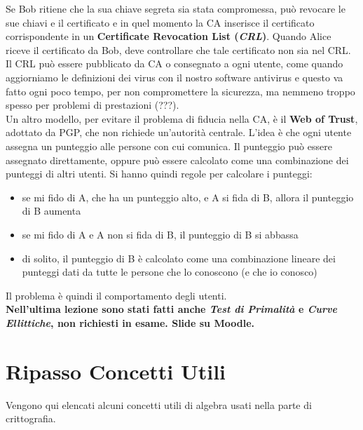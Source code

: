 \documentclass[a4paper,12pt, oneside]{book}
\begin{document}
Se Bob ritiene che la sua chiave segreta sia stata compromessa, può revocare le
sue chiavi e il certificato e in quel momento la CA inserisce il certificato
corrispondente in un \textbf{Certificate Revocation List (\textit{CRL})}. Quando
Alice riceve il certificato da Bob, deve controllare che tale certificato non
sia nel CRL. Il CRL può essere pubblicato da CA o consegnato a ogni utente, come
quando aggiorniamo le definizioni dei virus con il nostro software antivirus e
questo va fatto ogni poco tempo, per non compromettere la sicurezza, ma nemmeno
troppo spesso per problemi di prestazioni (???).\\
Un altro modello, per evitare il problema di fiducia nella CA, è il \textbf{Web
  of Trust}, adottato da PGP, che non richiede un'autorità centrale. L'idea è
che ogni utente assegna un punteggio alle persone con cui comunica. Il punteggio
può essere assegnato direttamente, oppure può essere calcolato come una
combinazione dei punteggi di altri utenti. Si hanno quindi regole per calcolare
i punteggi:
\begin{itemize}
  \item se mi fido di A, che ha un punteggio alto, e A si fida di B, allora il
  punteggio di B aumenta  
  \item se mi fido di A e A non si fida di B, il punteggio di B si abbassa 
  \item di solito, il punteggio di B è calcolato come una combinazione lineare
  dei punteggi dati da tutte le persone che lo conoscono (e che io conosco)  
\end{itemize}
Il problema è quindi il comportamento degli utenti.\\
\textbf{Nell'ultima lezione sono stati fatti anche \textit{Test di Primalità} e
  \textit{Curve Ellittiche},
  non richiesti in esame. Slide su Moodle.}
\chapter{Ripasso Concetti Utili}
Vengono qui elencati alcuni concetti utili di algebra usati nella parte di
crittografia.
\end{document}
